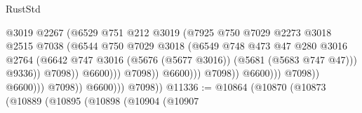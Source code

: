 \begin{lexlean}{RustStd}
\begin{coremodule}
                                                      @3019
                                                      @2267
                                                      (@6529
                                                        @751
                                                        @212
                                                        @3019
                                                        (@7925
                                                          @750
                                                          @7029
                                                          @2273
                                                          @3018
                                                          @2515
                                                          @7038
                                                          (@6544
                                                            @750
                                                            @7029
                                                            @3018
                                                            (@6549
                                                              @748
                                                              @473
                                                              @47
                                                              @280
                                                              @3016
                                                              @2764
                                                              (@6642
                                                                @747
                                                                @3016
                                                                (@5676 (@5677 @3016))
                                                                (@5681 (@5683 @747 @47)))
                                                              @9336))
                                                          @7098))
                                                      @6600)))
                                                @7098))
                                            @6600)))
                                      @7098))
                                  @6600)))
                            @7098))
                        @6600)))
                  @7098))
              @6600)))
        @7098))
@11336 := @10864
    (@10870
      (@10873
        (@10889
          (@10895
            (@10898
              (@10904
                (@10907

\end{coremodule}
\end{lexlean}
